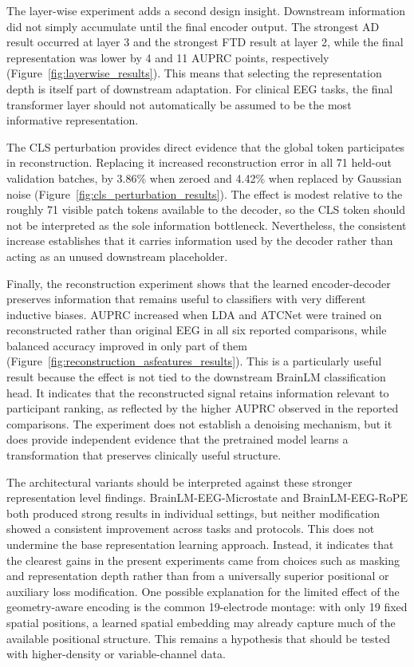The layer-wise experiment adds a second design insight. Downstream information did not simply accumulate until the final encoder output. The strongest AD result occurred at layer 3 and the strongest FTD result at layer 2, while the final representation was lower by 4 and 11 AUPRC points, respectively (Figure~\ref{fig:layerwise_results}). This means that selecting the representation depth is itself part of downstream adaptation. For clinical EEG tasks, the final transformer layer should not automatically be assumed to be the most informative representation.

The CLS perturbation provides direct evidence that the global token participates in reconstruction. Replacing it increased reconstruction error in all 71 held-out validation batches, by 3.86\% when zeroed and 4.42\% when replaced by Gaussian noise (Figure~\ref{fig:cls_perturbation_results}). The effect is modest relative to the roughly 71 visible patch tokens available to the decoder, so the CLS token should not be interpreted as the sole information bottleneck. Nevertheless, the consistent increase establishes that it carries information used by the decoder rather than acting as an unused downstream placeholder.

Finally, the reconstruction experiment shows that the learned encoder-decoder preserves information that remains useful to classifiers with very different inductive biases. AUPRC increased when LDA and ATCNet were trained on reconstructed rather than original EEG in all six reported comparisons, while balanced accuracy improved in only part of them (Figure~\ref{fig:reconstruction_asfeatures_results}). This is a particularly useful result because the effect is not tied to the downstream BrainLM classification head. It indicates that the reconstructed signal retains information relevant to participant ranking, as reflected by the higher AUPRC observed in the reported comparisons. The experiment does not establish a denoising mechanism, but it does provide independent evidence that the pretrained model learns a transformation that preserves clinically useful structure.

The architectural variants should be interpreted against these stronger representation level findings. BrainLM-EEG-Microstate and BrainLM-EEG-RoPE both produced strong results in individual settings, but neither modification showed a consistent improvement across tasks and protocols. This does not undermine the base representation learning approach. Instead, it indicates that the clearest gains in the present experiments came from choices such as masking and representation depth rather than from a universally superior positional or auxiliary loss modification. One possible explanation for the limited effect of the geometry-aware encoding is the common 19-electrode montage: with only 19 fixed spatial positions, a learned spatial embedding may already capture much of the available positional structure. This remains a hypothesis that should be tested with higher-density or variable-channel data.

